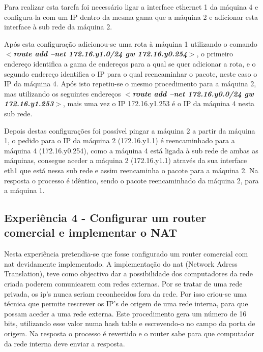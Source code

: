 \documentclass[a4paper]{article}
\begin{document}
Para realizar esta tarefa foi necessário ligar a interface ethernet 1 da máquina 4 e configura-la com um IP dentro da mesma gama que a máquina 2 e adicionar esta interface à sub rede da máquina 2.

Após esta configuração adicionou-se uma rota à máquina 1 utilizando o comando \textbf{\textit{$<$route add –net  172.16.y1.0/24 gw 172.16.y0.254$>$}}, o primeiro endereço identifica a gama de endereços para a qual se quer adicionar a rota, e o segundo endereço identifica o IP para o qual reencaminhar o pacote, neste caso o IP da máquina 4. Após isto repetiu-se o mesmo procedimento para a máquina 2, mas utilizando os seguintes endereços \textbf{\textit{$<$route add –net 172.16.y0.0/24 gw 172.16.y1.253$>$}}, mais uma vez o IP 172.16.y1.253 é o IP da máquina 4 nesta sub rede.

Depois destas configurações foi possível pingar a máquina 2 a partir da máquina 1, o pedido para o IP da máquina 2 (172.16.y1.1) é reencaminhado para a máquina 4 (172.16.y0.254), como a máquina 4 está ligada à sub rede de ambas as máquinas, consegue aceder a máquina 2 (172.16.y1.1) através da sua interface eth1 que está nessa sub rede e assim reencaminha o pacote para a máquina 2. Na resposta o processo é idêntico, sendo o pacote reencaminhado da máquina 2, para a máquina 1.



\subsection{Experiência 4 - Configurar um router comercial e implementar o NAT}
Nesta experiência pretendia-se que fosse configurado um router comercial com nat devidamente implementado. A implementação do nat (Network Adress Translation), teve como objectivo dar a possibilidade dos computadores da rede criada poderem comunicarem com redes externas. Por se tratar de uma rede privada, os ip’s nunca seriam reconhecidos fora da rede. Por isso criou-se uma técnica que permite rescrever os IP’s de origem  de uma rede interna, para que possam aceder a uma rede externa. Este procedimento gera um número de 16 bits, utilizando esse valor numa hash table e escrevendo-o no campo da porta de origem. Na resposta o processo é revertido e o router sabe para que computador da rede interna deve enviar a resposta.
\end{document}
